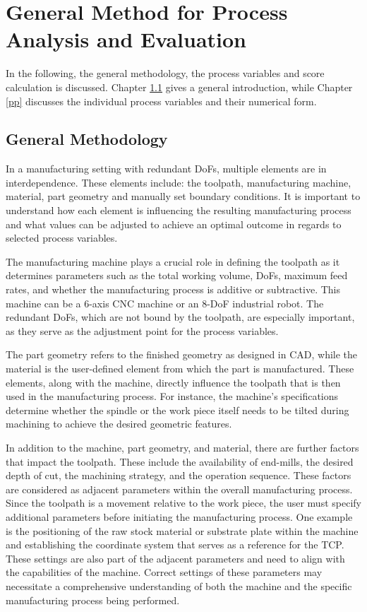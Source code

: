 \newpage
\section{General Method for Process Analysis and Evaluation}
In the following, the general methodology, the process variables and score calculation is discussed.
Chapter \ref{general} gives a general introduction, while Chapter \ref{pp} discusses the individual process variables and their numerical form.




\subsection{General Methodology}\label{general}
In a manufacturing setting with redundant \acrshort{DoF}s, multiple elements are in interdependence. These elements include: the toolpath, manufacturing machine, material, part geometry and manually set boundary conditions. It is important to understand how each element is influencing the resulting manufacturing process and what values can be adjusted to achieve an optimal outcome in regards to selected process variables.

The manufacturing machine plays a crucial role in defining the toolpath as it determines parameters such as the total working volume, \acrshort{DoF}s, maximum feed rates, and whether the manufacturing process is additive or subtractive. This machine can be a 6-axis \acrshort{CNC} machine or an 8-\acrshort{DoF} industrial robot. The redundant \acrshort{DoF}s, which are not bound by the toolpath, are especially important, as they serve as the adjustment point for the process variables.

The part geometry refers to the finished geometry as designed in \acrshort{CAD}, while the material is the user-defined element from which the part is manufactured. These elements, along with the machine, directly influence the toolpath that is then used in the manufacturing process. For instance, the machine's specifications determine whether the spindle or the work piece itself needs to be tilted during machining to achieve the desired geometric features.

In addition to the machine, part geometry, and material, there are further factors that impact the toolpath. These include the availability of end-mills, the desired depth of cut, the machining strategy, and the operation sequence. These factors are considered as adjacent parameters within the overall manufacturing process. Since the toolpath is a movement relative to the work piece, the user must specify additional parameters before initiating the manufacturing process. One example is the positioning of the raw stock material or substrate plate within the machine and establishing the coordinate system that serves as a reference for the \acrshort{TCP}. These settings are also part of the adjacent parameters and need to align with the capabilities of the machine. Correct settings of these parameters may necessitate a comprehensive understanding of both the machine and the specific manufacturing process being performed.

